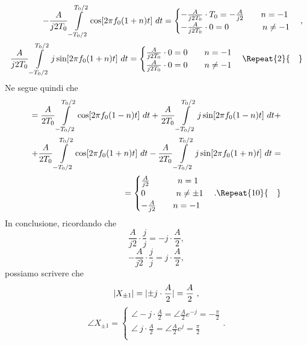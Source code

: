 \documentclass[12pt,oneside,openany]{memoir}
\numberwithin{equation}{subsection}
\DeclarePairedDelimiter{\abs}{\lvert}{\rvert}
\newcommand{\quads}[1]{\Repeat{#1}{\quad}}
\newcommand{\dt}{\ dt}
\begin{document}
\begin{equation}
	\begin{split}
		-\frac{A}{j 2 T_0} \int\displaylimits_{-T_0/2}^{T_0/2} \cos[2 \pi f_0 (1 + n) t] \dt =
			\begin{cases}
				-\frac{A}{j 2 T_0} \cdot T_0 = -\frac{A}{j 2} \quad\quad n = -1\\
				-\frac{A}{j 2 T_0} \cdot 0 = 0 \quad\quad \ \ \ \ \ \ n \neq -1
			\end{cases},
		\\
		\frac{A}{j 2 T_0} \int\displaylimits_{-T_0/2}^{T_0/2} j \sin[2 \pi f_0 (1 + n) t] \dt =
			\begin{cases}
				\frac{A}{j 2 T_0} \cdot 0 = 0 \quad\quad n = -1\\
				\frac{A}{j 2 T_0} \cdot 0 = 0 \quad\quad n \neq -1
			\end{cases}
			\quads{2}
	\end{split}
\end{equation}
Ne segue quindi che
\begin{equation}
	\begin{split}
		= \frac{A}{2 T_0} \int\displaylimits_{-T_0/2}^{T_0/2}
		\cos[2 \pi f_0 (1 - n) t] \dt + \frac{A}{2 T_0}
		\int\displaylimits_{-T_0/2}^{T_0/2} j \sin[2 \pi f_0 (1 - n) t]
		\dt +
		\\
		+ \frac{A}{2 T_0} \int\displaylimits_{-T_0/2}^{T_0/2}
		\cos[2 \pi f_0 (1 + n) t] \dt - \frac{A}{2 T_0}
		\int\displaylimits_{-T_0/2}^{T_0/2} j \sin[2 \pi f_0 (1 + n) t]
		\dt =
		\\
		=
		\begin{cases}
			\frac{A}{j 2} \quad\quad \ \ \ \ n = 1\\
			0 \quad\quad \ \ \ \ \ n \neq \pm 1\\
			-\frac{A}{j 2} \quad\quad n = -1
		\end{cases}.
		\quads{10}
	\end{split}
\end{equation}
In conclusione, ricordando che
\[
\frac{A}{j 2} \cdot \frac{j}{j} = -j \cdot \frac{A}{2},
\]
\[
-\frac{A}{j 2} \cdot \frac{j}{j} = j \cdot \frac{A}{2},
\]
possiamo scrivere che
\begin{equation}
	\abs{X_{\pm 1}} = \abs{\pm j \cdot \frac{A}{2}} = \frac{A}{2} \ ,
\end{equation}
\begin{equation}
	\angle X_{\pm 1} =
		\begin{cases}
			\angle -j \cdot \frac{A}{2} = \angle \frac{A}{2} e^{-j}
			= -\frac{\pi}{2}\\
			\angle \ j \cdot \frac{A}{2} = \angle \frac{A}{2} e^{j}
			= \frac{\pi}{2}\\
		\end{cases}.
\end{equation}
\end{document}
